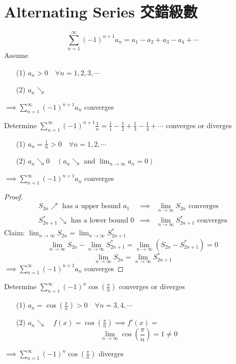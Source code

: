 \section{Alternating Series 交錯級數}
\begin{defn}
\[\displaystyle \sum^{\infty}_{n = 1} (-1)^{n + 1} a_n = a_1 - a_2 + a_3 - a_4 + \cdots\]
Assume
\begin{itemize}
\item[(1)] \(a_n > 0 \quad \forall n = 1, 2, 3, \cdots\)
\item[(2)] \(a_n \searrow\)
\end{itemize}
\(\implies \displaystyle \sum^{\infty}_{n = 1} (-1)^{n + 1} a_n\) converges
\end{defn}
\begin{eg}
Determine \(\displaystyle \sum^{\infty}_{n = 1} (-1)^{n+1} \frac{1}{n} = \frac{1}{1} - \frac{1}{2} + \frac{1}{3} - \frac{1}{4} + \cdots\) converges or diverges

\soln
\begin{itemize}
\item[(1)] \(a_n = \frac{1}{n} > 0 \quad \forall n = 1, 2, \cdots\)
\item[(2)] \(a_n \searrow 0 \quad (a_n \searrow \text{ and } \displaystyle \lim_{n \to \infty} a_n = 0)\)
\end{itemize}
\(\implies \displaystyle \sum^{\infty}_{n = 1} (-1)^{n+1} a_n\) converges
\end{eg}
\begin{proof}
\[\begin{array}{rcl}
S_{2n} \nearrow \text{ has a upper bound } a_1 & \implies & \displaystyle \lim_{n \to \infty} S_{2n} \text{ converges}\\
S^*_{2n +1} \searrow \text{ has a lower bound } 0 & \implies & \displaystyle \lim_{n \to \infty} S^*_{2n + 1} \text{ converges}
\end{array}\]
Claim: \(\displaystyle \lim_{n \to \infty} S_{2n} = \lim_{n \to \infty} S^*_{2n + 1}\)\\
\[\displaystyle \lim_{n \to \infty} S_{2n} - \lim_{n \to \infty} S^*_{2n + 1} = \lim_{n \to \infty} (S_{2n} - S^*_{2n+ 1}) = 0\]
\[\displaystyle \lim_{n \to \infty} S_{2n} = \lim_{n \to \infty} S^*_{2n + 1}\]
\(\implies \displaystyle \sum^{\infty}_{n = 1} (-1)^{n +1} a_n\) converges
\end{proof}
\begin{eg}
Determine \(\displaystyle \sum^{\infty}_{n = 1} (-1)^n \cos (\frac{\pi}{n})\) converges or diverges

\soln
\begin{itemize}
\item[(1)] \(\displaystyle a_n = \cos (\frac{\pi}{n}) > 0 \quad \forall n = 3, 4, \cdots\)
\item[(2)] \(\displaystyle a_n \searrow \quad f(x) = \cos (\frac{\pi}{n}) \implies f'(x) = \)\\
\[\displaystyle \lim_{n \to \infty} \cos (\frac{\pi}{n}) = 1 \neq 0\]
\end{itemize}
\(\implies \displaystyle \sum^{\infty}_{n = 1} (-1)^n \cos (\frac{\pi}{n})\) diverges
\end{eg}
